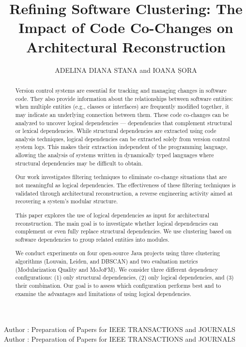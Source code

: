 \documentclass{ieeeaccess}
\begin{document}

\title{Refining Software Clustering: The Impact of Code Co-Changes on Architectural Reconstruction}
\author{\uppercase{Adelina Diana Stana} and
\uppercase{Ioana Șora}
}

\address[1]{Department of Computer and Information Technology,
Politehnica University of Timisoara, Romania (e-mail: adelina.stana@cs.upt.ro)}
\address[2]{Department of Computer and Information Technology,
Politehnica University of Timisoara, Romania (e-mail: ioana.sora@cs.upt.ro)}

\markboth
{Author \headeretal: Preparation of Papers for IEEE TRANSACTIONS and JOURNALS}
{Author \headeretal: Preparation of Papers for IEEE TRANSACTIONS and JOURNALS}


\begin{abstract}  
Version control systems are essential for tracking and managing changes in software code. They also provide information about the relationships between software entities: when multiple entities (e.g., classes or interfaces) are frequently modified together, it may indicate an underlying connection between them. These code co-changes can be analyzed to uncover logical dependencies — dependencies that complement structural or lexical dependencies.
While structural dependencies are extracted using code analysis techniques, logical dependencies can be extracted solely from version control system logs. This makes their extraction independent of the programming language, allowing the analysis of systems written in dynamically typed languages where structural dependencies may be difficult to obtain.

Our work investigates filtering techniques to eliminate co-change situations that are not meaningful as logical dependencies. The effectiveness of these filtering techniques is validated through architectural reconstruction, a reverse engineering activity aimed at recovering a system's modular structure. 

This paper explores the use of logical dependencies as input for architectural reconstruction. The main goal is to investigate whether logical dependencies can complement or even fully replace structural dependencies. We use clustering based on software dependencies to group related entities into modules.

We conduct experiments on four open-source Java projects using three clustering algorithms (Louvain, Leiden, and DBSCAN) and two evaluation metrics (Modularization Quality and MoJoFM). We consider three different dependency configurations: (1) only structural dependencies, (2) only logical dependencies, and (3) their combination. Our goal is to assess which configuration performs best and to examine the advantages and limitations of using logical dependencies.

\end{abstract}  
\end{document}
